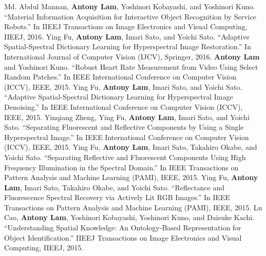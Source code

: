 \documentclass[letterpaper,10pt]{article}
\begin{document}
\vspace{0.05in}\newline
Md. Abdul Mannan, \textbf{Antony Lam}, Yoshinori Kobayashi, and Yoshinori Kuno. ``Material Information Acquisition for Interactive Object Recognition by Service Robots.'' In IIEEJ Transactions on Image Electronics and Visual Computing, IIEEJ, 2016.\vspace{0.05in}\newline
Ying Fu, \textbf{Antony Lam}, Imari Sato, and Yoichi Sato. ``Adaptive Spatial-Spectral Dictionary Learning for Hyperspectral Image Restoration.'' In International Journal of Computer Vision (IJCV), Springer, 2016.\vspace{0.05in}\newline
\textbf{Antony Lam} and Yoshinori Kuno. ``Robust Heart Rate Measurement from Video Using Select Random Patches.'' In IEEE International Conference on Computer Vision (ICCV), IEEE, 2015.\vspace{0.05in}\newline\newline\newline
Ying Fu, \textbf{Antony Lam}, Imari Sato, and Yoichi Sato. ``Adaptive Spatial-Spectral Dictionary Learning for Hyperspectral Image Denoising.'' In IEEE International Conference on Computer Vision (ICCV), IEEE, 2015.\vspace{0.05in}\newline
Yinqiang Zheng, Ying Fu, \textbf{Antony Lam}, Imari Sato, and Yoichi Sato. ``Separating Fluorescent and Reflective Components by Using a Single Hyperspectral Image.'' In IEEE International Conference on Computer Vision (ICCV), IEEE, 2015.\vspace{0.05in}\newline
Ying Fu, \textbf{Antony Lam}, Imari Sato, Takahiro Okabe, and Yoichi Sato. ``Separating Reflective and Fluorescent Components Using High Frequency Illumination in the Spectral Domain.'' In IEEE Transactions on Pattern Analysis and Machine Learning (PAMI), IEEE, 2015.\vspace{0.05in}\newline
Ying Fu, \textbf{Antony Lam}, Imari Sato, Takahiro Okabe, and Yoichi Sato. ``Reflectance and Fluorescence Spectral Recovery via Actively Lit RGB Images.'' In IEEE Transactions on Pattern Analysis and Machine Learning (PAMI), IEEE, 2015.\vspace{0.05in}\newline
Lu Cao, \textbf{Antony Lam}, Yoshinori Kobayashi, Yoshinori Kuno, and Daisuke Kachi. ``Understanding Spatial Knowledge: An Ontology-Based Representation for Object Identification.'' IIEEJ Transactions on Image Electronics and Visual Computing, IIEEJ, 2015.\vspace{0.05in}\newline
\end{document}
